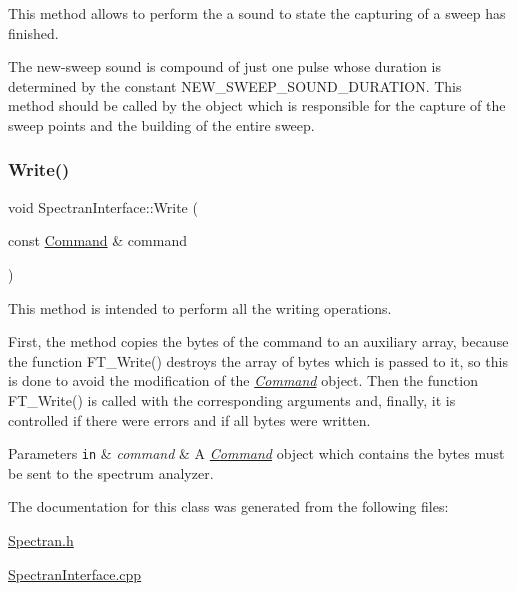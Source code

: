 This method allows to perform the a sound to state the capturing of a sweep has finished. 

The new-\/sweep sound is compound of just one pulse whose duration is determined by the constant N\+E\+W\+\_\+\+S\+W\+E\+E\+P\+\_\+\+S\+O\+U\+N\+D\+\_\+\+D\+U\+R\+A\+T\+I\+ON. This method should be called by the object which is responsible for the capture of the sweep points and the building of the entire sweep. \mbox{\label{classSpectranInterface_a3046fce691a5ed248e3fd647b0b043e8}} 
\subsubsection{\texorpdfstring{Write()}{Write()}}
{\footnotesize\ttfamily void Spectran\+Interface\+::\+Write (\begin{DoxyParamCaption}\item[{const \hyperlink{classCommand}{Command} \&}]{command }\end{DoxyParamCaption})\hspace{0.3cm}{\ttfamily [inline]}}



This method is intended to perform all the writing operations. 

First, the method copies the bytes of the command to an auxiliary array, because the function {\ttfamily F\+T\+\_\+\+Write()} destroys the array of bytes which is passed to it, so this is done to avoid the modification of the {\itshape \hyperlink{classCommand}{Command}} object. Then the function {\ttfamily F\+T\+\_\+\+Write()} is called with the corresponding arguments and, finally, it is controlled if there were errors and if all bytes were written. 
\begin{DoxyParams}[1]{Parameters}
\mbox{\tt in}  & {\em command} & A {\itshape \hyperlink{classCommand}{Command}} object which contains the bytes must be sent to the spectrum analyzer. \\
\hline
\end{DoxyParams}


The documentation for this class was generated from the following files\+:\begin{DoxyCompactItemize}
\item 
\hyperlink{Spectran_8h}{Spectran.\+h}\item 
\hyperlink{SpectranInterface_8cpp}{Spectran\+Interface.\+cpp}\end{DoxyCompactItemize}
